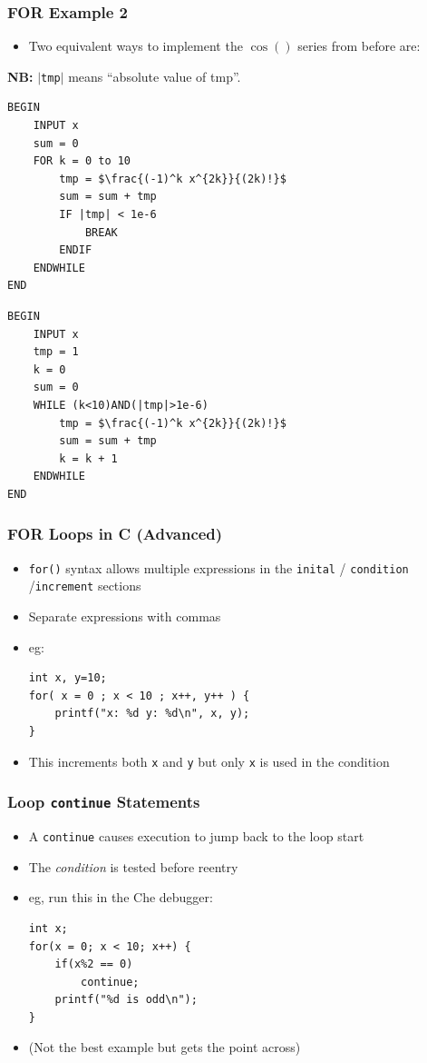 \documentclass[14pt]{beamer}
\begin{document}
\begin{frame}[fragile]
\frametitle{FOR Example 2}
\begin{itemize}
\item Two equivalent ways to implement the $\cos()$ series from before are:
\end{itemize}
{\small\textbf{NB:} $|$\texttt{tmp}$|$ means ``absolute value of tmp''.}
\begin{multicols}{2}
\begin{lstlisting}[style=pseudo,mathescape=true,basicstyle=\ttfamily\scriptsize]
BEGIN
	INPUT x
	sum = 0
	FOR k = 0 to 10
		tmp = $\frac{(-1)^k x^{2k}}{(2k)!}$
		sum = sum + tmp
		IF |tmp| < 1e-6
			BREAK
		ENDIF
	ENDWHILE 
END
\end{lstlisting}
\columnbreak
\begin{lstlisting}[style=pseudo,mathescape=true,basicstyle=\ttfamily\scriptsize]
BEGIN
	INPUT x
	tmp = 1
	k = 0
	sum = 0
	WHILE (k<10)AND(|tmp|>1e-6)
		tmp = $\frac{(-1)^k x^{2k}}{(2k)!}$
		sum = sum + tmp
		k = k + 1
	ENDWHILE 
END
\end{lstlisting}

\end{multicols}
\end{frame}



\begin{frame}[fragile]
\frametitle{FOR Loops in C (Advanced)}
\begin{itemize}
\item \texttt{for()} syntax allows multiple expressions in the \texttt{inital} / \texttt{condition} /\texttt{increment} sections
\item Separate expressions with commas
\item eg:
\begin{lstlisting}[style=CStyle]
int x, y=10;
for( x = 0 ; x < 10 ; x++, y++ ) {
	printf("x: %d y: %d\n", x, y);
}
\end{lstlisting}
\item This increments both \texttt{x} and \texttt{y} but only \texttt{x} is used in the condition
\end{itemize}
\end{frame}

\begin{frame}[fragile]
\frametitle{Loop \texttt{continue} Statements}
\begin{itemize}
	\item A \texttt{continue} causes execution to jump back to the loop start
	\item The \textit{condition} is tested before reentry	
	\item eg, run this in the Che debugger:
	\begin{lstlisting}[style=CStyle]
int x;
for(x = 0; x < 10; x++) {
	if(x%2 == 0)
		continue;
	printf("%d is odd\n");
}
\end{lstlisting}
\item {\small(Not the best example but gets the point across)}
\end{itemize}
\end{frame}
\end{document}

